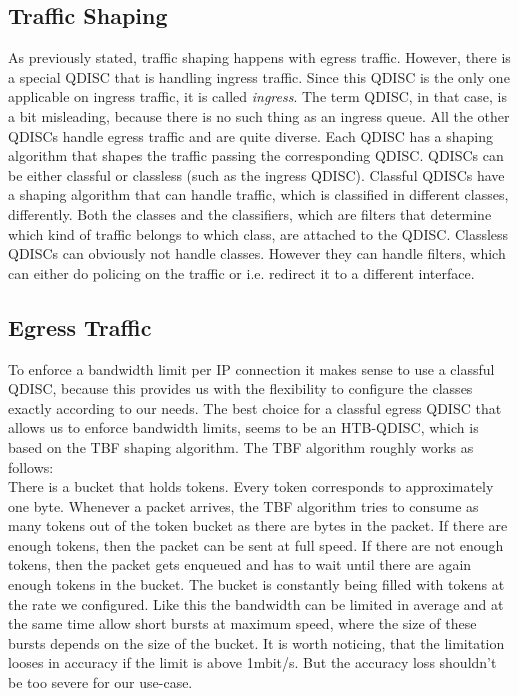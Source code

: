 \subsection{Traffic Shaping}
As previously stated, traffic shaping happens with egress traffic. However, there is a special \acs{QDISC} that is handling ingress traffic. Since this \acs{QDISC} is the only one applicable on ingress traffic, it is called \textit{ingress}. The term \acl{QDISC}, in that case, is a bit misleading, because there is no such thing as an ingress queue. All the other \acsp{QDISC} handle egress traffic and are quite diverse. Each \acs{QDISC} has a shaping algorithm that shapes the traffic passing the corresponding \acs{QDISC}. \acsp{QDISC} can be either classful or classless (such as the ingress \acs{QDISC}). Classful \acsp{QDISC} have a shaping algorithm that can handle traffic, which is classified in different classes, differently. Both the classes and the classifiers, which are filters that determine which kind of traffic belongs to which class, are attached to the \acs{QDISC}. Classless \acsp{QDISC} can obviously not handle classes. However they can handle filters, which can either do policing on the traffic or i.e. redirect it to a different interface.

\subsection{Egress Traffic}
To enforce a bandwidth limit per \acs{IP} connection it makes sense to use a classful \acs{QDISC}, because this provides us with the flexibility to configure the classes exactly according to our needs. The best choice for a classful egress \acs{QDISC} that allows us to enforce bandwidth limits, seems to be an \ac{HTB}-\acs{QDISC}, which is based on the \ac{TBF} shaping algorithm. The \acs{TBF} algorithm roughly works as follows: 
\\There is a bucket that holds tokens. Every token corresponds to approximately one byte. Whenever a packet arrives, the \acs{TBF} algorithm tries to consume as many tokens out of the token bucket as there are bytes in the packet. If there are enough tokens, then the packet can be sent at full speed. If there are not enough tokens, then the packet gets enqueued and has to wait until there are again enough tokens in the bucket. The bucket is constantly being filled with tokens at the rate we configured. Like this the bandwidth can be limited in average and at the same time allow short bursts at maximum speed, where the size of these bursts depends on the size of the bucket. It is worth noticing, that the limitation looses in accuracy if the limit is above 1mbit/s. But the accuracy loss shouldn't be too severe for our use-case.

